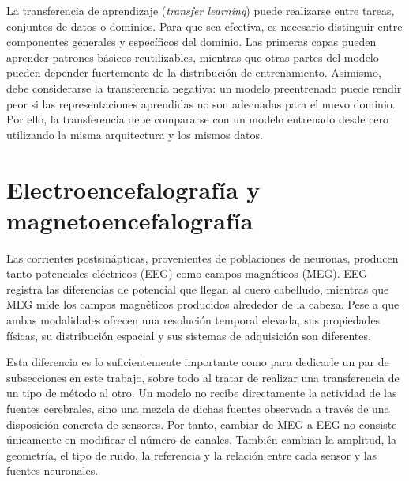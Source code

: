 La transferencia de aprendizaje (\textit{transfer learning}) puede realizarse entre tareas, conjuntos de datos o dominios. Para que sea efectiva, es necesario distinguir entre componentes generales y específicos del dominio. Las primeras capas pueden aprender patrones básicos reutilizables, mientras que otras partes del modelo pueden depender fuertemente de la distribución de entrenamiento. Asimismo, debe considerarse la transferencia negativa: un modelo preentrenado puede rendir peor si las representaciones aprendidas no son adecuadas para el nuevo dominio. Por ello, la transferencia debe compararse con un modelo entrenado desde cero utilizando la misma arquitectura y los mismos datos.

\section{Electroencefalografía y magnetoencefalografía}

Las corrientes postsinápticas, provenientes de poblaciones de neuronas, producen tanto potenciales eléctricos (EEG) como campos magnéticos (MEG). EEG registra las diferencias de potencial que llegan al cuero cabelludo, mientras que MEG mide los campos magnéticos producidos alrededor de la cabeza. Pese a que ambas modalidades ofrecen una resolución temporal elevada, sus propiedades físicas, su distribución espacial y sus sistemas de adquisición son diferentes.

Esta diferencia es lo suficientemente importante como para dedicarle un par de subsecciones en este trabajo, sobre todo al tratar de realizar una transferencia de un tipo de método al otro. Un modelo no recibe directamente la actividad de las fuentes cerebrales, sino una mezcla de dichas fuentes observada a través de una disposición concreta de sensores. Por tanto, cambiar de MEG a EEG no consiste únicamente en modificar el número de canales. También cambian la amplitud, la geometría, el tipo de ruido, la referencia y la relación entre cada sensor y las fuentes neuronales.

